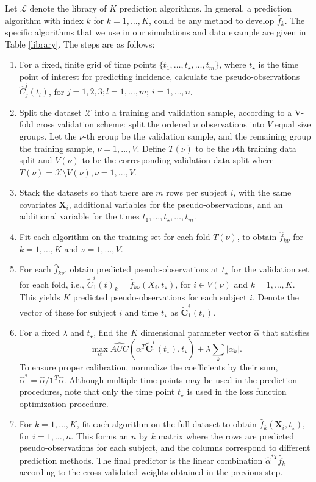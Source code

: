 \documentclass{statsoc}
\begin{document}
Let $\mathcal{L}$ denote the library of $K$ prediction algorithms. In general, a prediction algorithm with index $k$ for $k = 1, \ldots, K$, could be any method to develop $\hat{f}_k$. The specific algorithms that we use in our simulations and data example are given in Table \ref{library}. The steps are as follows: 

\begin{enumerate}
\item For a fixed, finite grid of time points $\{t_1, \ldots, t_{\star}, \ldots, t_m\}$, where $t_{\star}$ is the time point of interest for predicting incidence, calculate the pseudo-observations $\hat{C}^i_j(t_l)$, for $j = 1, 2, 3; l = 1, \ldots, m$; $i = 1, \ldots, n$. 
\item Split the dataset $\mathcal{X}$ into a training and validation sample, according to a V-fold cross validation scheme: split the ordered $n$ observations into $V$ equal size groups. Let the $\nu$-th group be the validation sample, and the remaining group the training sample, $\nu = 1,...,V$. Define $T(\nu)$ to be the $\nu$th training data split and $V(\nu)$ to be the corresponding validation data split where $T(\nu) = \mathcal{X} \setminus V (\nu), \nu = 1,...,V$.

\item Stack the datasets so that there are $m$ rows per subject $i$, with the same covariates $\mathbf{X}_i$, additional variables for the pseudo-observations, and an additional variable for the times $t_1, \ldots, t_{\star}, \ldots, t_m$. 
\item Fit each algorithm on the training set for each fold $T(\nu)$, to obtain $\hat{f}_{k\nu}$ for $k = 1, \ldots, K$ and $\nu = 1,...,V$. 
\item For each $\hat{f}_{k\nu}$, obtain predicted pseudo-observations at $t_{\star}$ for the validation set for each fold, i.e., $\tilde{C}^i_1(t)_{k} = \hat{f}_{k\nu}(X_i, t_{\star})$, for $i \in V(\nu)$ and $k = 1, \ldots, K$. This yields $K$ predicted pseudo-observations for each subject $i$. Denote the vector of these for subject $i$ and time $t_{\star}$ as $\mathbf{\tilde{C}}^i_1(t_{\star})$.
\item For a fixed $\lambda$ and $t_{\star}$, find the $K$ dimensional parameter vector $\hat{\alpha}$ that satisfies 
		\[
        \max_\alpha \widehat{AUC}(\alpha^T \mathbf{\tilde{C}}^i_1(t_{\star}), t_{\star}) + \lambda \sum_k |\alpha_k|. 
        \]
        To ensure proper calibration, normalize the coefficients by their sum, $\hat{\alpha}^* = \hat{\alpha} / \mathbf{1}^T \hat{\alpha}$. Although multiple time points may be used in the prediction procedures, note that only the time point $t_{\star}$ is used in the loss function optimization procedure.  
\item For $k = 1, \dots, K$, fit each algorithm on the full dataset to obtain $\hat{f}_k(\mathbf{X}_i, t_{\star})$, for $i = 1, \dots, n$. This forms an $n$ by $k$ matrix where the rows are predicted pseudo-observations for each subject, and the columns correspond to different prediction methods. The final predictor is the linear combination $\hat{\alpha}^{*T}\hat{f}_k$ according to the cross-validated weights obtained in the previous step.
\end{enumerate}
\end{document}
